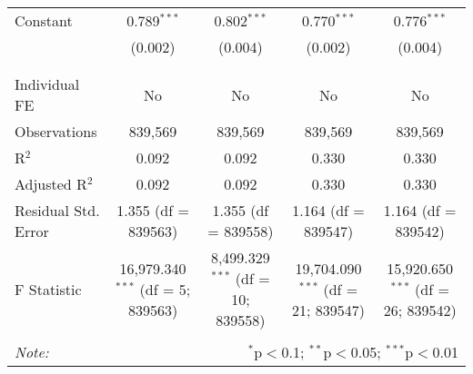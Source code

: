 \documentclass[
]{article}
\begin{document}
\begin{table}[!htbp]
{\begin{tabular}{@{\extracolsep{5pt}}lcccc}
 Constant & 0.789$^{***}$ & 0.802$^{***}$ & 0.770$^{***}$ & 0.776$^{***}$ \\ 
  & (0.002) & (0.004) & (0.002) & (0.004) \\ 
  & & & & \\ 
\hline \\[-1.8ex] 
Individual FE & No & No & No & No \\ 
Observations & 839,569 & 839,569 & 839,569 & 839,569 \\ 
R$^{2}$ & 0.092 & 0.092 & 0.330 & 0.330 \\ 
Adjusted R$^{2}$ & 0.092 & 0.092 & 0.330 & 0.330 \\ 
Residual Std. Error & 1.355 (df = 839563) & 1.355 (df = 839558) & 1.164 (df = 839547) & 1.164 (df = 839542) \\ 
F Statistic & 16,979.340$^{***}$ (df = 5; 839563) & 8,499.329$^{***}$ (df = 10; 839558) & 19,704.090$^{***}$ (df = 21; 839547) & 15,920.650$^{***}$ (df = 26; 839542) \\ 
\hline 
\hline \\[-1.8ex] 
\textit{Note:}  & \multicolumn{4}{r}{$^{*}$p$<$0.1; $^{**}$p$<$0.05; $^{***}$p$<$0.01} \\ 
\end{tabular}
} 
\end{table} 
\newpage
\end{document}
